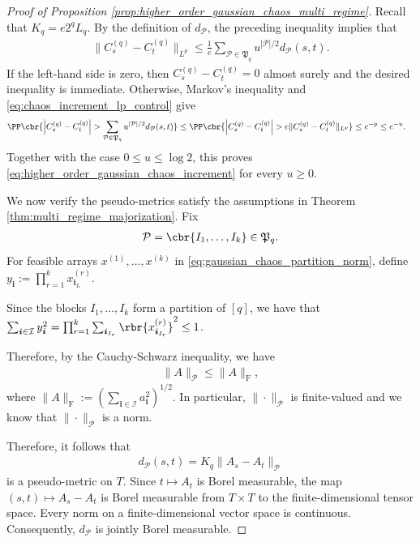 \documentclass[11pt]{article}
\begin{document}
\begin{proof}[Proof of Proposition
\ref{prop:higher_order_gaussian_chaos_multi_regime}]
Recall that
$K_q=e2^qL_q$. By the definition of $d_{\mathcal P}$, the preceding
inequality implies that
\begin{align}
\|C_s^{(q)}-C_t^{(q)}\|_{L^p}
\le
\frac1e
\sum_{\mathcal P\in\mathfrak P_q}
u^{|\mathcal P|/2}d_{\mathcal P}(s,t).
\label{eq:chaos_increment_lp_control}
\end{align}
If the left-hand side is zero, then
$C_s^{(q)}-C_t^{(q)}=0$ almost surely and the desired inequality is
immediate. Otherwise, Markov's inequality and
\eqref{eq:chaos_increment_lp_control} give
\begin{align*}
&\PP\cbr{
\left|C_s^{(q)}-C_t^{(q)}\right|
>
\sum_{\mathcal P\in\mathfrak P_q}
u^{|\mathcal P|/2}d_{\mathcal P}(s,t)
}\le
\PP\cbr{
\left|C_s^{(q)}-C_t^{(q)}\right|
>
e\|C_s^{(q)}-C_t^{(q)}\|_{L^p}
}\le
e^{-p}
\le
e^{-u}.
\end{align*}
Together with the case $0\le u\le\log2$, this proves
\eqref{eq:higher_order_gaussian_chaos_increment} for every $u\ge0$.

We now verify the pseudo-metrics satisfy the assumptions in Theorem \ref{thm:multi_regime_majorization}. Fix
\begin{align*}
\mathcal P
=
\cbr{I_1,\ldots,I_k}
\in
\mathfrak P_q.
\end{align*}
For feasible arrays $x^{(1)},\ldots,x^{(k)}$ in
\eqref{eq:gaussian_chaos_partition_norm}, define $y_{\boldsymbol i}
:=
\prod_{r=1}^k
x^{(r)}_{\boldsymbol i_{I_r}}$.

Since the blocks $I_1,\ldots,I_k$ form a partition of $[q]$, we have that $\sum_{\boldsymbol i\in\mathcal I}y_{\boldsymbol i}^2=
\prod_{r=1}^k
\sum_{\boldsymbol i_{I_r}}
\rbr{x^{(r)}_{\boldsymbol i_{I_r}}}^2
\le
1$.

Therefore, by the Cauchy-Schwarz inequality, we have
\begin{align}
\|A\|_{\mathcal P}
\le
\|A\|_{\mathrm F},
\label{eq:partition_norm_frobenius_domination}
\end{align}
where $\|A\|_{\mathrm F}
:=
\left(
\sum_{\boldsymbol i\in\mathcal I}a_{\boldsymbol i}^2
\right)^{1/2}$.
In particular, $\|\cdot\|_{\mathcal P}$ is finite-valued and we know that $\|\cdot\|_{\mathcal P}$ is a norm.

Therefore, it follows that
\begin{align*}
d_{\mathcal P}(s,t)
=
K_q\|A_s-A_t\|_{\mathcal P}
\end{align*}
is a pseudo-metric on $T$. Since $t\mapsto A_t$ is Borel measurable,
the map $(s,t)\mapsto
A_s-A_t$ is Borel measurable from $T\times T$ to the finite-dimensional tensor
space. Every norm on a finite-dimensional vector space is continuous.
Consequently, $d_{\mathcal P}$ is jointly Borel measurable.


\end{proof}
\end{document}
